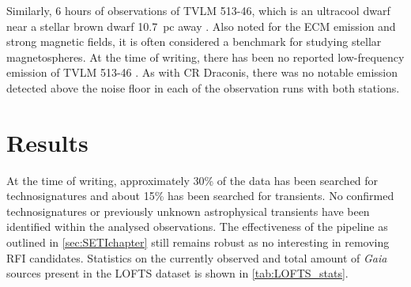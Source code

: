 Similarly, 6 hours of observations of TVLM 513-46, which is an ultracool dwarf near a stellar brown dwarf 10.7~pc away \citep{hallinan_rotational_2006}. Also noted for the ECM emission and strong magnetic fields, it is often considered a benchmark for studying stellar magnetospheres. At the time of writing, there has been no reported low-frequency emission of TVLM 513-46 \citep{jaeger_325_2011}. As with CR Draconis, there was no notable emission detected above the noise floor in each of the observation runs with both stations. 





\section{Results}\label{sec:results_lofts}

At the time of writing, approximately 30\% of the data has been searched for technosignatures and about 15\% has been searched for transients. No confirmed technosignatures or previously unknown astrophysical transients have been identified within the analysed observations. The effectiveness of the pipeline as outlined in \cref{sec:SETIchapter} still remains robust as no interesting in removing RFI candidates. Statistics on the currently observed and total amount of \textit{Gaia} sources present in the LOFTS dataset is shown in \cref{tab:LOFTS_stats}.

